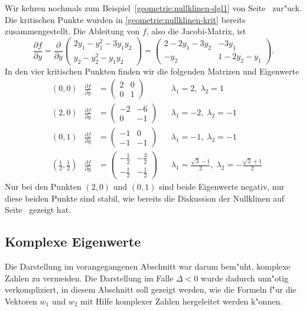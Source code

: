 \begin{beispiel}
Wir kehren nochmals zum Beispiel~\eqref{geometrie:nullklinen-dgl1}
von Seite~\pageref{geometrie:nullklinen-dgl1} zur"uck.
Die kritischen Punkte wurden in \eqref{geometrie:nullklinen-krit} bereits
zusammengestellt.
Die Ableitung von $f$, also die Jacobi-Matrix, ist
\[
\frac{\partial f}{\partial y}
=
\frac{\partial}{\partial y}
\begin{pmatrix}
2y_1-y_1^2-3y_1y_2\\
y_2-y_2^2-y_1y_2
\end{pmatrix}
=
\begin{pmatrix}
2-2y_1-3y_2 & -3y_1\\
-y_2        &1-2y_2-y_1
\end{pmatrix}.
\]
In den vier kritischen Punkten finden wir die folgenden Matrizen und
Eigenwerte
\begin{align*}
&(0,0)
	&\frac{\partial f}{\partial y}&=\begin{pmatrix}2&0\\0&1\end{pmatrix}
		&&\lambda_1=2,\;\lambda_2=1\\
&(2,0)
	&\frac{\partial f}{\partial y}&=\begin{pmatrix}-2&-6\\0&-1\end{pmatrix}
		&&\lambda_1=-2,\;\lambda_2=-1\\
&(0,1)
	&\frac{\partial f}{\partial y}&=\begin{pmatrix}-1&0\\-1&-1\end{pmatrix}
		&&\lambda_1=-1,\;\lambda_2=-1\\
&\textstyle(\frac12,\frac12)
	&\frac{\partial f}{\partial y}&=\begin{pmatrix}-\frac12&-\frac32\\-\frac12&-\frac12\end{pmatrix}
		&&\lambda_1=\frac{\sqrt{3}-1}2,\;\lambda_2=-\frac{\sqrt{3}+1}2
\end{align*}
Nur bei den Punkten $(2,0)$ und $(0,1)$ sind beide Eigenwerte negativ,
nur diese beiden Punkte sind stabil, wie bereits die  Diskussion der
Nullklinen auf Seite~\pageref{geometrie:nullklinen-stabilitaet}
gezeigt hat.
\end{beispiel}

%
%
\subsection{Komplexe Eigenwerte}
Die Darstellung im vorangegangenen Abschnitt war darum bem"uht,
komplexe Zahlen zu vermeiden.
Die Darstellung im Falle $\Delta<0$ wurde dadurch unn"otig verkompliziert,
in diesem Abschnitt soll gezeigt werden, wie die Formeln f"ur die Vektoren
$w_1$ und $w_2$ mit Hilfe komplexer Zahlen hergeleitet werden k"onnen.

